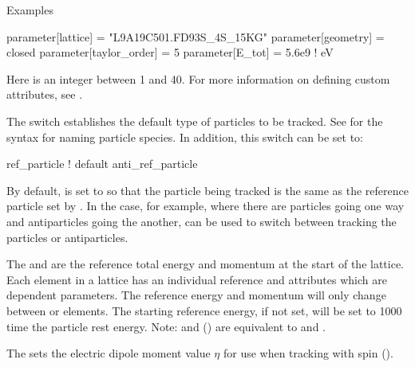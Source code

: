 \noindent
Examples
\begin{example}
  parameter[lattice]      = "L9A19C501.FD93S_4S_15KG"
  parameter[geometry]     = closed
  parameter[taylor_order] = 5
  parameter[E_tot]        = 5.6e9    ! eV
\end{example}

  \begin{description}
%
  \item[{parameter[custom_attributeN]}] \Newline
Here  is an integer between 1 and 40.  For more information on defining custom attributes, see
.
%
  \item[{parameter[default_tracking_species]}] \Newline
The  switch establishes the default type of particles to be
tracked. See  for the syntax for naming particle species. In addition, this switch
can be set to:
\begin{example}
  ref_particle     ! default
  anti_ref_particle
\end{example}
By default,  is set to  so that the particle being
tracked is the same as the reference particle set by . In the case, for example,
where there are particles going one way and antiparticles going the another,
 can be used to switch between tracking the particles or antiparticles.
%
  \item[{parameter[e_tot], parameter[p0c]}] \Newline
The  and  are the reference total energy and momentum at the
start of the lattice. Each element in a lattice has an individual reference  and 
attributes which are dependent parameters. The reference energy and momentum will only change
between  or  elements. The starting reference energy, if not set, will be set
to 1000 time the particle rest energy.  Note:  and 
() are equivalent to  and .
%
  \item[{parameter[electric_dipole_moment]}] \Newline
The  sets the electric dipole moment value $\eta$ for use when tracking
with spin ().
%
  \item[{parameter[geometry]}] \Newline

\end{description}
